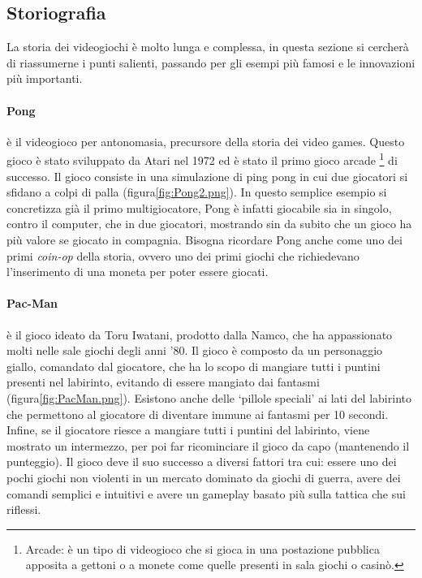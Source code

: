     \subsection{Storiografia}\label{subsec:VideogiochiStoriografia}
        La storia dei videogiochi è molto lunga e complessa, in questa sezione si cercherà di riassumerne i punti salienti, passando per gli esempi più famosi e le
        innovazioni più importanti.

        \paragraph{Pong} è il videogioco per antonomasia, precursore della storia dei video games. Questo gioco è stato sviluppato da Atari nel 1972 ed è stato il primo gioco arcade
            \footnote{Arcade: è un tipo di videogioco che si gioca in una postazione pubblica apposita a gettoni o a monete come quelle presenti in sala giochi o casinò.}
            di successo. Il gioco consiste in una simulazione di ping pong in cui due giocatori si sfidano a colpi di palla (figura\ref{fig:Pong2.png}). In questo semplice esempio si concretizza già il primo 
            multigiocatore, Pong è infatti giocabile sia in singolo, contro il computer, che in due giocatori, mostrando sin da subito che un gioco ha più valore se giocato in compagnia. 
            Bisogna ricordare Pong anche come uno dei primi \textit{coin-op} della storia, ovvero uno dei primi giochi che richiedevano l'inserimento di una moneta per poter 
            essere giocati.

        \paragraph{Pac-Man} è il gioco ideato da Toru Iwatani, prodotto dalla Namco, che ha appassionato molti nelle sale giochi degli anni '80. Il gioco è composto da un personaggio giallo,
            comandato dal giocatore, che ha lo scopo di mangiare tutti i puntini presenti nel labirinto, evitando di essere mangiato dai fantasmi (figura\ref{fig:PacMan.png}). Esistono 
            anche delle `pillole speciali' ai lati del labirinto che permettono al giocatore di diventare immune ai fantasmi per 10 secondi. Infine, se il giocatore riesce a mangiare tutti
            i puntini del labirinto, viene mostrato un intermezzo, per poi far ricominciare il gioco da capo (mantenendo il punteggio). Il gioco deve il suo successo a diversi fattori tra cui: 
            essere uno dei pochi giochi non violenti in un mercato dominato da giochi di guerra, avere dei comandi semplici e intuitivi e avere un gameplay basato più sulla tattica 
            che sui riflessi\cite{Uston1982}.

